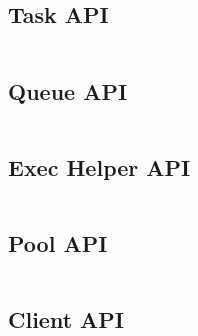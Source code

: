\documentclass[11pt]{article}
\begin{document}
\inputminted{C}{../include/modules/config.h}

\subsection{Task API} \label{task_api}

\inputminted{C}{../include/modules/task.h}

\subsection{Queue API} \label{queue_api}

\inputminted{C}{../include/modules/queue.h}

\subsection{Exec Helper API} \label{exec_helper_api}

\inputminted{C}{../include/modules/exec_helper.h}

\subsection{Pool API} \label{pool_api}

\inputminted{C}{../include/modules/pool.h}

\subsection{Client API} \label{client_api}

\inputminted{C}{../src/client/aurras.c}
\end{document}
